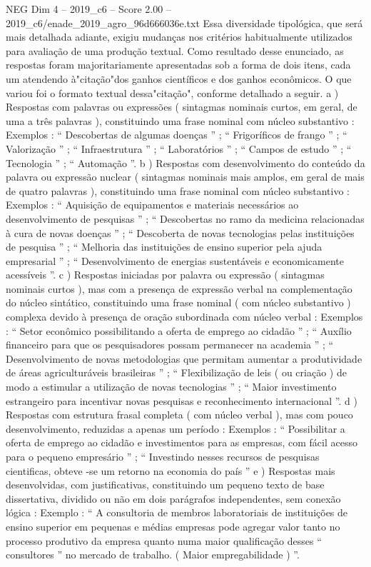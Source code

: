 \begin{textsample}{NEG Dim 4 – 2019\_c6 – Score 2.00 – 2019\_c6/enade\_2019\_agro\_96d666036e.txt}
Essa diversidade tipológica, que será mais detalhada adiante, exigiu mudanças nos critérios habitualmente utilizados para avaliação de uma produção textual.
Como resultado desse enunciado, as respostas foram majoritariamente apresentadas sob a forma de dois itens, cada um atendendo à"citação"dos ganhos científicos e dos ganhos econômicos.
O que variou foi o formato textual dessa"citação", conforme detalhado a seguir. a ) Respostas com palavras ou expressões ( sintagmas nominais curtos, em geral, de uma a três palavras ), constituindo uma frase nominal com núcleo substantivo : Exemplos : “ Descobertas de algumas doenças ” ; “ Frigoríficos de frango ” ; “ Valorização ” ; “ Infraestrutura ” ; “ Laboratórios ” ; “ Campos de estudo ” ; “ Tecnologia ” ; “ Automação ”. b ) Respostas com desenvolvimento do conteúdo da palavra ou expressão nuclear ( sintagmas nominais mais amplos, em geral de mais de quatro palavras ), constituindo uma frase nominal com núcleo substantivo : Exemplos : “ Aquisição de equipamentos e materiais necessários ao desenvolvimento de pesquisas ” ; “ Descobertas no ramo da medicina relacionadas à cura de novas doenças ” ; “ Descoberta de novas tecnologias pelas instituições de pesquisa ” ; “ Melhoria das instituições de ensino superior pela ajuda empresarial ” ; “ Desenvolvimento de energias sustentáveis e economicamente acessíveis ”. c ) Respostas iniciadas por palavra ou expressão ( sintagmas nominais curtos ), mas com a presença de expressão verbal na complementação do núcleo sintático, constituindo uma frase nominal ( com núcleo substantivo ) complexa devido à presença de oração subordinada com núcleo verbal : Exemplos : “ Setor econômico possibilitando a oferta de emprego ao cidadão ” ; “ Auxílio financeiro para que os pesquisadores possam permanecer na academia ” ; “ Desenvolvimento de novas metodologias que permitam aumentar a produtividade de áreas agriculturáveis brasileiras ” ; “ Flexibilização de leis ( ou criação ) de modo a estimular a utilização de novas tecnologias ” ; “ Maior investimento estrangeiro para incentivar novas pesquisas e reconhecimento internacional ”. d ) Respostas com estrutura frasal completa ( com núcleo verbal ), mas com pouco desenvolvimento, reduzidas a apenas um período : Exemplos : “ Possibilitar a oferta de emprego ao cidadão e investimentos para as empresas, com fácil acesso para o pequeno empresário ” ; “ Investindo nesses recursos de pesquisas cientificas, obteve -se um retorno na economia do país ” e ) Respostas mais desenvolvidas, com justificativas, constituindo um pequeno texto de base dissertativa, dividido ou não em dois parágrafos independentes, sem conexão lógica : Exemplo : “ A consultoria de membros laboratoriais de instituições de ensino superior em pequenas e médias empresas pode agregar valor tanto no processo produtivo da empresa quanto numa maior qualificação desses “ consultores ” no mercado de trabalho. ( Maior empregabilidade ) ”.

\end{textsample}
